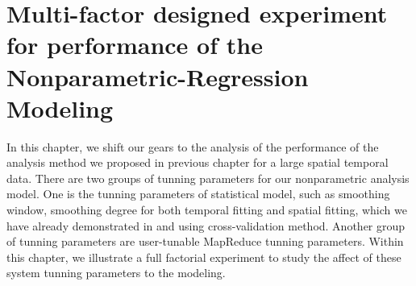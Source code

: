 \chapter{Multi-factor designed experiment for performance of the 
Nonparametric-Regression Modeling}

In this chapter, we shift our gears to the analysis of the performance of the 
analysis method we proposed in previous chapter for a large spatial temporal data.
There are two groups of tunning parameters for our nonparametric analysis model.
One is the tunning parameters of statistical model, such as smoothing window, 
smoothing degree for both temporal fitting and spatial fitting, which we have
already demonstrated in \cite{} and \cite{} using cross-validation method. Another
group of tunning parameters are user-tunable MapReduce tunning parameters. Within
this chapter, we illustrate a full factorial experiment to study the affect of
these system tunning parameters to the modeling.







